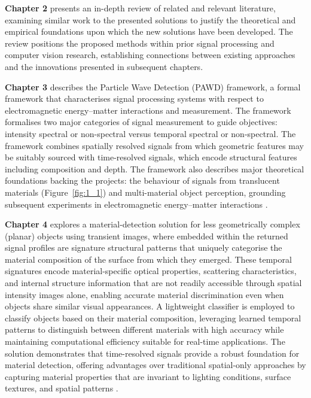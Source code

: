 \documentclass[12pt,a4paper,oneside]{report}
\begin{document}
\textbf{Chapter 2} presents an in-depth review of related and relevant literature, examining similar work to the presented solutions to justify the theoretical and empirical foundations upon which the new solutions have been developed. The review positions the proposed methods within prior signal processing and computer vision research, establishing connections between existing approaches and the innovations presented in subsequent chapters.

\textbf{Chapter 3} describes the Particle Wave Detection (PAWD) framework, a formal framework that characterises signal processing systems with respect to electromagnetic energy--matter interactions and measurement. The framework formalises two major categories of signal measurement to guide objectives: intensity spectral or non-spectral versus temporal spectral or non-spectral. The framework combines spatially resolved signals from which geometric features may be suitably sourced with time-resolved signals, which encode structural features including composition and depth. The framework also describes major theoretical foundations backing the projects: the behaviour of signals from translucent materials (Figure~\ref{fig:1_1}) and multi-material object perception, grounding subsequent experiments in electromagnetic energy--matter interactions \cite{jungerman2022}.

\textbf{Chapter 4} explores a material-detection solution for less geometrically complex (planar) objects using transient images, where embedded within the returned signal profiles are signature structural patterns that uniquely categorise the material composition of the surface from which they emerged. These temporal signatures encode material-specific optical properties, scattering characteristics, and internal structure information that are not readily accessible through spatial intensity images alone, enabling accurate material discrimination even when objects share similar visual appearances. A lightweight classifier is employed to classify objects based on their material composition, leveraging learned temporal patterns to distinguish between different materials with high accuracy while maintaining computational efficiency suitable for real-time applications. The solution demonstrates that time-resolved signals provide a robust foundation for material detection, offering advantages over traditional spatial-only approaches by capturing material properties that are invariant to lighting conditions, surface textures, and spatial patterns \cite{jungerman2022,becker2023}.
\end{document}
